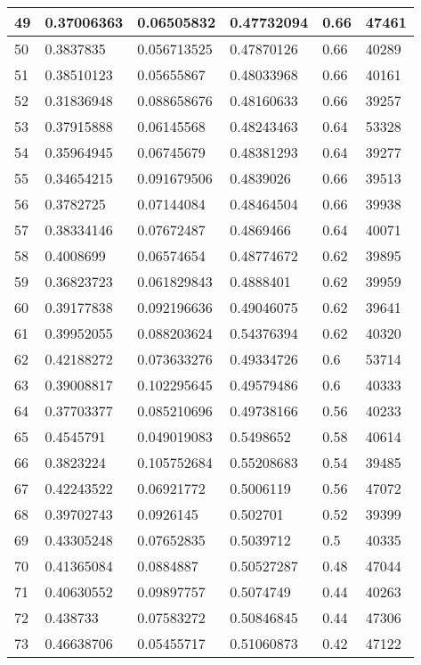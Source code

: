 \begin{longtable}{|l|l|l|l|l|l|}
49 & 0.37006363 & 0.06505832 & 0.47732094 & 0.66 & 47461 \\ \hline 
50 & 0.3837835 & 0.056713525 & 0.47870126 & 0.66 & 40289 \\ \hline 
51 & 0.38510123 & 0.05655867 & 0.48033968 & 0.66 & 40161 \\ \hline 
52 & 0.31836948 & 0.088658676 & 0.48160633 & 0.66 & 39257 \\ \hline 
53 & 0.37915888 & 0.06145568 & 0.48243463 & 0.64 & 53328 \\ \hline 
54 & 0.35964945 & 0.06745679 & 0.48381293 & 0.64 & 39277 \\ \hline 
55 & 0.34654215 & 0.091679506 & 0.4839026 & 0.66 & 39513 \\ \hline 
56 & 0.3782725 & 0.07144084 & 0.48464504 & 0.66 & 39938 \\ \hline 
57 & 0.38334146 & 0.07672487 & 0.4869466 & 0.64 & 40071 \\ \hline 
58 & 0.4008699 & 0.06574654 & 0.48774672 & 0.62 & 39895 \\ \hline 
59 & 0.36823723 & 0.061829843 & 0.4888401 & 0.62 & 39959 \\ \hline 
60 & 0.39177838 & 0.092196636 & 0.49046075 & 0.62 & 39641 \\ \hline 
61 & 0.39952055 & 0.088203624 & 0.54376394 & 0.62 & 40320 \\ \hline 
62 & 0.42188272 & 0.073633276 & 0.49334726 & 0.6 & 53714 \\ \hline 
63 & 0.39008817 & 0.102295645 & 0.49579486 & 0.6 & 40333 \\ \hline 
64 & 0.37703377 & 0.085210696 & 0.49738166 & 0.56 & 40233 \\ \hline 
65 & 0.4545791 & 0.049019083 & 0.5498652 & 0.58 & 40614 \\ \hline 
66 & 0.3823224 & 0.105752684 & 0.55208683 & 0.54 & 39485 \\ \hline 
67 & 0.42243522 & 0.06921772 & 0.5006119 & 0.56 & 47072 \\ \hline 
68 & 0.39702743 & 0.0926145 & 0.502701 & 0.52 & 39399 \\ \hline 
69 & 0.43305248 & 0.07652835 & 0.5039712 & 0.5 & 40335 \\ \hline 
70 & 0.41365084 & 0.0884887 & 0.50527287 & 0.48 & 47044 \\ \hline 
71 & 0.40630552 & 0.09897757 & 0.5074749 & 0.44 & 40263 \\ \hline 
72 & 0.438733 & 0.07583272 & 0.50846845 & 0.44 & 47306 \\ \hline 
73 & 0.46638706 & 0.05455717 & 0.51060873 & 0.42 & 47122 \\ \hline 

\end{longtable}
